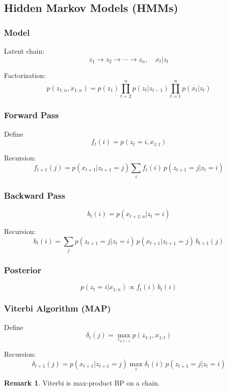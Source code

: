 \documentclass[12pt,oneside]{book}
\numberwithin{equation}{section}
\theoremstyle{definition}
\newtheorem{remark}{Remark}[section]
\theoremstyle{plain}
\theoremstyle{remark}
\begin{document}
\subsection{Hidden Markov Models (HMMs)}

\subsubsection*{Model}

Latent chain:
\[
z_1 \to z_2 \to \cdots \to z_n, \quad x_t | z_t
\]

Factorization:
\[
p(z_{1:n}, x_{1:n})
=
p(z_1)\prod_{t=2}^n p(z_t | z_{t-1})
\prod_{t=1}^n p(x_t | z_t)
\]


\subsubsection*{Forward Pass}

Define
\[
f_t(i) = p(z_t = i, x_{1:t})
\]

Recursion:
\[
f_{t+1}(j)
=
p(x_{t+1} | z_{t+1}=j)
\sum_i f_t(i)\, p(z_{t+1}=j | z_t=i)
\]


\subsubsection*{Backward Pass}

\[
b_t(i) = p(x_{t+1:n} | z_t = i)
\]

Recursion:
\[
b_t(i)
=
\sum_j p(z_{t+1}=j | z_t=i)\, p(x_{t+1}|z_{t+1}=j)\, b_{t+1}(j)
\]


\subsubsection*{Posterior}

\[
p(z_t = i | x_{1:n})
\propto f_t(i)\, b_t(i)
\]


\subsubsection*{Viterbi Algorithm (MAP)}

Define
\[
\delta_t(j)
=
\max_{z_{1:t-1}} p(z_{1:t}, x_{1:t})
\]

Recursion:
\[
\delta_{t+1}(j)
=
p(x_{t+1}|z_{t+1}=j)
\max_i \delta_t(i)\, p(z_{t+1}=j|z_t=i)
\]

\begin{remark}
Viterbi is max-product BP on a chain.
\end{remark}
\end{document}
